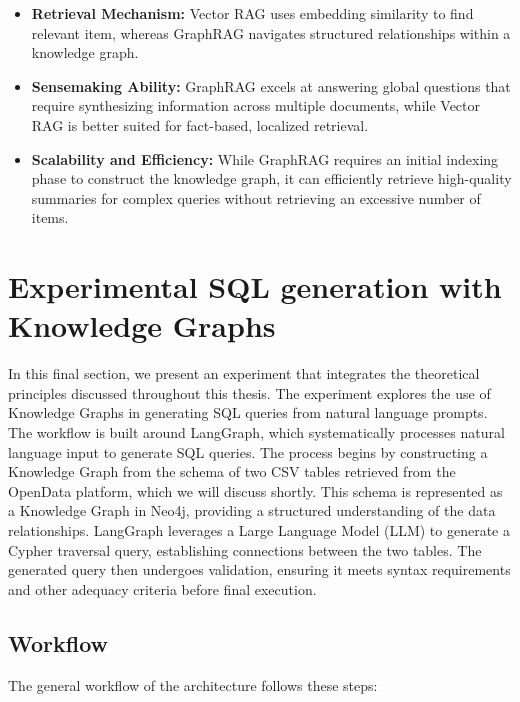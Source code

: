 \begin{itemize}
    \item 	\textbf{Retrieval Mechanism:} Vector RAG uses embedding similarity to find relevant item, whereas GraphRAG navigates structured relationships within a knowledge graph.
    \item 	\textbf{Sensemaking Ability:} GraphRAG excels at answering global questions that require synthesizing information across multiple documents, while Vector RAG is better suited for fact-based, localized retrieval.
    \item 	\textbf{Scalability and Efficiency:} While GraphRAG requires an initial indexing phase to construct the knowledge graph, it can efficiently retrieve high-quality summaries for complex queries without retrieving an excessive number of items.
\end{itemize}

\section{Experimental SQL generation with Knowledge Graphs}
In this final section, we present an experiment that integrates the theoretical principles discussed throughout this thesis. The experiment explores the use of Knowledge Graphs in generating SQL queries from natural language prompts. The workflow is built around LangGraph, which systematically processes natural language input to generate SQL queries. The process begins by constructing a Knowledge Graph from the schema of two CSV tables retrieved from the OpenData platform, which we will discuss shortly. This schema is represented as a Knowledge Graph in Neo4j, providing a structured understanding of the data relationships. LangGraph leverages a Large Language Model (LLM) to generate a Cypher traversal query, establishing connections between the two tables. The generated query then undergoes validation, ensuring it meets syntax requirements and other adequacy criteria before final execution.
\subsection{Workflow}

The general workflow of the architecture follows these steps:

